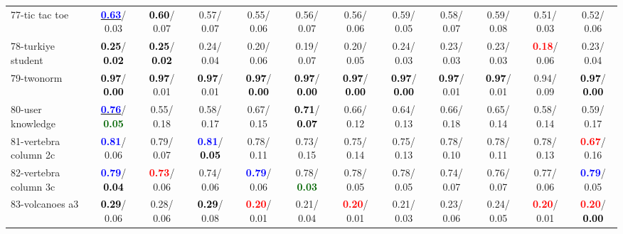 \begin{table}[h]
\begin{center}
{\begin{tabular}{lc|c|c|c|c|c|c|c|c|c|c}
77-tic tac toe & \underline{\textcolor{blue}{\textbf{  0.63}}}/  0.03 & \textcolor{black}{\textbf{  0.60}}/  0.07 &   0.57/  0.07 &   0.55/  0.06 &   0.56/  0.07 &   0.56/  0.06 &   0.59/  0.05 &   0.58/  0.07 &   0.59/  0.08 &   0.51/  0.03 &   0.52/  0.06 \\
78-turkiye student & \textcolor{black}{\textbf{  0.25}}/\textcolor{black}{\textbf{  0.02}} & \textcolor{black}{\textbf{  0.25}}/\textcolor{black}{\textbf{  0.02}} &   0.24/  0.04 &   0.20/  0.06 &   0.19/  0.07 &   0.20/  0.05 &   0.24/  0.03 &   0.23/  0.03 &   0.23/  0.03 & \textcolor{red}{\textbf{  0.18}}/  0.06 &   0.23/  0.04 \\ \hline
79-twonorm & \textcolor{black}{\textbf{  0.97}}/\textcolor{black}{\textbf{  0.00}} & \textcolor{black}{\textbf{  0.97}}/  0.01 & \textcolor{black}{\textbf{  0.97}}/  0.01 & \textcolor{black}{\textbf{  0.97}}/\textcolor{black}{\textbf{  0.00}} & \textcolor{black}{\textbf{  0.97}}/\textcolor{black}{\textbf{  0.00}} & \textcolor{black}{\textbf{  0.97}}/\textcolor{black}{\textbf{  0.00}} & \textcolor{black}{\textbf{  0.97}}/\textcolor{black}{\textbf{  0.00}} & \textcolor{black}{\textbf{  0.97}}/  0.01 & \textcolor{black}{\textbf{  0.97}}/  0.01 &   0.94/  0.09 & \textcolor{black}{\textbf{  0.97}}/\textcolor{black}{\textbf{  0.00}} \\
80-user knowledge & \underline{\textcolor{blue}{\textbf{  0.76}}}/\textcolor{darkgreen}{\textbf{  0.05}} &   0.55/  0.18 &   0.58/  0.17 &   0.67/  0.15 & \textcolor{black}{\textbf{  0.71}}/\textcolor{black}{\textbf{  0.07}} &   0.66/  0.12 &   0.64/  0.13 &   0.66/  0.18 &   0.65/  0.14 &   0.58/  0.14 &   0.59/  0.17 \\
81-vertebra column 2c & \textcolor{blue}{\textbf{  0.81}}/  0.06 &   0.79/  0.07 & \textcolor{blue}{\textbf{  0.81}}/\textcolor{black}{\textbf{  0.05}} &   0.78/  0.11 &   0.73/  0.15 &   0.75/  0.14 &   0.75/  0.13 &   0.78/  0.10 &   0.78/  0.11 &   0.78/  0.13 & \textcolor{red}{\textbf{  0.67}}/  0.16 \\
82-vertebra column 3c & \textcolor{blue}{\textbf{  0.79}}/\textcolor{black}{\textbf{  0.04}} & \textcolor{red}{\textbf{  0.73}}/  0.06 &   0.74/  0.06 & \textcolor{blue}{\textbf{  0.79}}/  0.06 &   0.78/\textcolor{darkgreen}{\textbf{  0.03}} &   0.78/  0.05 &   0.78/  0.05 &   0.74/  0.07 &   0.76/  0.07 &   0.77/  0.06 & \textcolor{blue}{\textbf{  0.79}}/  0.05 \\
83-volcanoes a3 & \textcolor{black}{\textbf{  0.29}}/  0.06 &   0.28/  0.06 & \textcolor{black}{\textbf{  0.29}}/  0.08 & \textcolor{red}{\textbf{  0.20}}/  0.01 &   0.21/  0.04 & \textcolor{red}{\textbf{  0.20}}/  0.01 &   0.21/  0.03 &   0.23/  0.06 &   0.24/  0.05 & \textcolor{red}{\textbf{  0.20}}/  0.01 & \textcolor{red}{\textbf{  0.20}}/\textcolor{black}{\textbf{  0.00}} \\

\end{tabular}}
\end{center}
\end{table}

